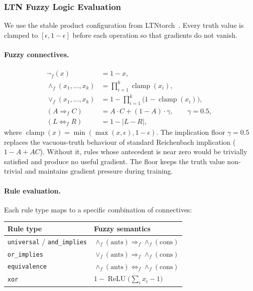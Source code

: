 \documentclass[11pt,a4paper]{article}
\begin{document}
\subsubsection{LTN Fuzzy Logic Evaluation}

We use the stable product configuration from
LTNtorch~\cite{ltntorch2024}.  Every truth value is clamped to
$[\epsilon, 1{-}\epsilon]$ before each operation so that gradients do not
vanish.

\paragraph{Fuzzy connectives.}
\begin{align}
  \lnot_f(x) &= 1 - x, \label{eq:fnot}\\[4pt]
  \land_f(x_1, \dots, x_k) &= \prod_{i=1}^{k}
    \operatorname{clamp}(x_i), \label{eq:fand}\\[4pt]
  \lor_f(x_1, \dots, x_k) &= 1 - \prod_{i=1}^{k}
    \bigl(1 - \operatorname{clamp}(x_i)\bigr), \label{eq:for}\\[4pt]
  (A \Rightarrow_f C) &= A \cdot C + (1 - A) \cdot \gamma,
    \qquad \gamma = 0.5, \label{eq:fimpl}\\[4pt]
  (L \Leftrightarrow_f R) &= 1 - |L - R|, \label{eq:fequiv}
\end{align}
where $\operatorname{clamp}(x) = \min(\max(x, \epsilon), 1{-}\epsilon)$.
The implication floor $\gamma{=}0.5$ replaces the vacuous-truth behaviour
of standard Reichenbach implication ($1{-}A{+}AC$).  Without it, rules
whose antecedent is near zero would be trivially satisfied and produce no
useful gradient.  The floor keeps the truth value non-trivial and
maintains gradient pressure during training.

\paragraph{Rule evaluation.}
Each rule type maps to a specific combination of connectives:
\begin{center}
\begin{tabular}{@{}ll@{}}
\toprule
\textbf{Rule type} & \textbf{Fuzzy semantics} \\
\midrule
\texttt{universal} / \texttt{and\_implies}
  & $\land_f(\text{ants}) \Rightarrow_f \land_f(\text{cons})$ \\
\texttt{or\_implies}
  & $\lor_f(\text{ants}) \Rightarrow_f \land_f(\text{cons})$ \\
\texttt{equivalence}
  & $\land_f(\text{ants}) \Leftrightarrow_f \land_f(\text{cons})$ \\
\texttt{xor}
  & $1 - \operatorname{ReLU}\!\bigl(\sum_i x_i - 1\bigr)$ \\
\bottomrule
\end{tabular}
\end{center}
\end{document}
